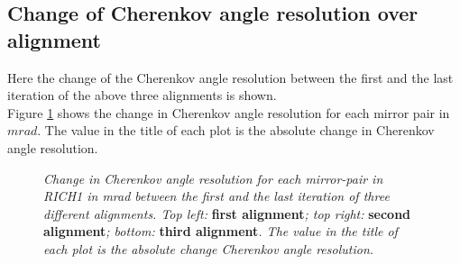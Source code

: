 \subsection{Change of Cherenkov angle resolution over alignment}
Here the change of the Cherenkov angle resolution between the first and the last iteration of the above three alignments is shown.\\
Figure \ref{fig:rich1del} shows the change in Cherenkov angle resolution for each mirror pair in $mrad$. The value in the title of each plot is the absolute change in Cherenkov angle resolution.\\
\begin{figure}[!h]
	\vspace*{-0.cm}
	\begin{center}
		\vspace*{-0.5cm}
	\end{center}
	\caption{\textit{Change in Cherenkov angle resolution for each mirror-pair in RICH1 in mrad between the first and the last iteration of three different alignments. Top left:} \textbf{first alignment}\textit{; top right:} \textbf{second alignment}\textit{; bottom:} \textbf{third alignment}\textit{. The value in the title of each plot is the absolute change Cherenkov angle resolution. } }
	\label{fig:rich1del}
\end{figure}

